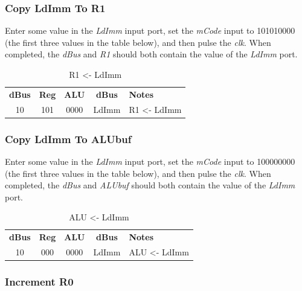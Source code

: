 \subsubsection{Copy LdImm To R1}
Enter some value in the \textit{LdImm} input port, set the \textit{mCode} input to 101010000 (the first three values in the table below), and then pulse the \textit{clk}. When completed, the \textit{dBus} and \textit{R1} should both contain the value of the \textit{LdImm} port.

\begin{table}[H]
	\sffamily
	\newcommand{\head}[1]{\textcolor{white}{\textbf{#1}}}		
	\begin{center}
		\begin{tabular}{ccccl} 
			\textbf{dBus} & \textbf{Reg} & \textbf{ALU} & \textbf{dBus} & \textbf{Notes} \\
			10 & 101 & 0000 & LdImm & R1 <- LdImm
		\end{tabular}
	\end{center}
	\caption{R1 <- LdImm}
	\label{tab:11-02}
\end{table}

\subsubsection{Copy LdImm To ALUbuf}
Enter some value in the \textit{LdImm} input port, set the \textit{mCode} input to 100000000 (the first three values in the table below), and then pulse the \textit{clk}. When completed, the \textit{dBus} and \textit{ALUbuf} should both contain the value of the \textit{LdImm} port.

\begin{table}[H]
	\sffamily
	\newcommand{\head}[1]{\textcolor{white}{\textbf{#1}}}		
	\begin{center}
		\begin{tabular}{ccccl} 
			\textbf{dBus} & \textbf{Reg} & \textbf{ALU} & \textbf{dBus} & \textbf{Notes} \\
			10 & 000 & 0000 & LdImm & ALU <- LdImm
		\end{tabular}
	\end{center}
	\caption{ALU <- LdImm}
	\label{tab:11-03}
\end{table}

\subsubsection{Increment R0}

